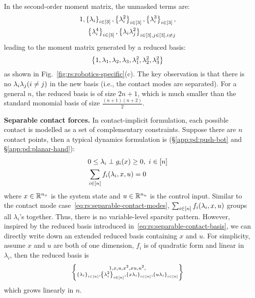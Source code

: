 In the second-order moment matrix, the unmasked terms are:
\begin{equation}
    \begin{split}
        1, \left\{ \lambda_i \right\}_{i \in \left[ 3 \right]}, \left\{ \lambda_i^2 \right\}_{i \in \left[ 3 \right]}, \left\{ \lambda_i^3 \right\}_{i \in \left[ 3 \right]}, \\ \left\{ \lambda_i^4 \right\}_{i \in \left[ 3 \right]}, \left\{ \lambda_i \lambda_j^2 \right\}_{i \in \left[ 3 \right], j \in \left[ 3 \right], i \ne j}
       \end{split}
\end{equation}
leading to the moment matrix generated by a reduced basis:
\begin{align}
    \label{eq:rs:separable-contact-basis}
    \left\{ 1,\lam{1},\lam{2},\lam{3},\lam{1}^2,\lam{2}^2,\lam{3}^2 \right\}
\end{align}
as shown in Fig.~\ref{fig:rs:robotics-specific}(c). The key observation is that there is no $\lam{i}\lam{j} (i \ne j)$ in the new basis (i.e., the contact modes are separated).
For a general $n$, the reduced basis is of size $2n+1$, which is much smaller than the standard monomial basis of size $\frac{(n+1)(n+2)}{2}$. 

\textbf{Separable contact forces.} In contact-implicit formulation, each possible contact is modelled as a set of complementary constraints. Suppose there are $n$ contact points, then a typical dynamics formulation is (\cf \S\ref{app:pd:push-bot} and \S\ref{app:pd:planar-hand}):
\begin{align}
    \label{eq:rs:contact-implicit}
    & 0 \le \lam{i} \perp g_i(x) \ge 0, \ i \in \enum{n} \\
    & \sum_{i \in \enum{n}} f_i(\lambda_i, x, u) = 0
\end{align}
where $x \in { {\mathbb R}^{n_x} }$ is the system state and $u \in { {\mathbb R}^{n_u} }$ is the control input. Similar to the contact mode case~\eqref{eq:rs:separable-contact-modes}, $\sum_{i \in \left[ n \right]} f_i(\lambda_i, x, u)$ groups all $\lambda_i$'s together. Thus, there is no variable-level sparsity pattern. However, inspired by the reduced basis introduced in~\eqref{eq:rs:separable-contact-basis}, we can directly write down an extended reduced basis containing $x$ and $u$. For simplicity, assume $x$ and $u$ are both of one dimension, $f_i$ is of quadratic form and linear in $\lambda_i$, then the reduced basis is
\begin{align}
    \left\{ \substack{
        1, x, u, x^2, xu, u^2, \\ \left\{ \lambda_i \right\}_{i \in \left[ n \right]}, 
        \left\{ \lambda_i^2 \right\}_{i \in \left[ n \right]}, \left\{ x \lambda_i \right\}_{i \in \left[ n \right]}, \left\{ u \lambda_i \right\}_{i \in \left[ n \right]}}
     \right\}
\end{align}
which grows linearly in $n$.